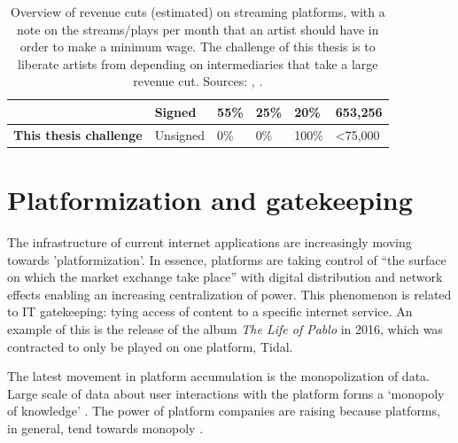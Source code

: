 \begin{table}[]
\begin{tabular}{|l|l|l|l|l|l|}
                               & Signed                      & 55\%               & 25\%                  & 20\%                     & 653,256                                                                                                    \\ \hline
\textbf{This thesis challenge} & Unsigned                    & 0\%                & 0\%                   & 100\%                    & \textless 75,000                                                                                           \\ \hline
\end{tabular}
\caption{Overview of revenue cuts (estimated) on streaming platforms, with a note on the streams/plays per month that an artist should have in order to make a minimum wage. The challenge of this thesis is to liberate artists from depending on intermediaries that take a large revenue cut. Sources: \cite{thetrichordist2014}, \cite{digitalmusicnews2018}.}
\label{tab:revenue-cuts}
\end{table}

\section{Platformization and gatekeeping}
The infrastructure of current internet applications are increasingly moving towards 'platformization'. In essence, platforms are taking control of ``the surface on which the market exchange take place'' \citep{andersson2016mastering} with digital distribution and network effects enabling an increasing centralization of power. This phenomenon is related to IT gatekeeping: tying access of content to a specific internet service. An example of this is the release of the album \textit{The Life of Pablo} in 2016, which was contracted to only be played on one platform, Tidal.

The latest movement in platform accumulation is the monopolization of data. Large scale of data about user interactions with the platform forms a `monopoly of knowledge' \citep{innis2007empire}. The power of platform companies are raising because platforms, in general, tend towards monopoly \citep{srnicek2017platform}. 

